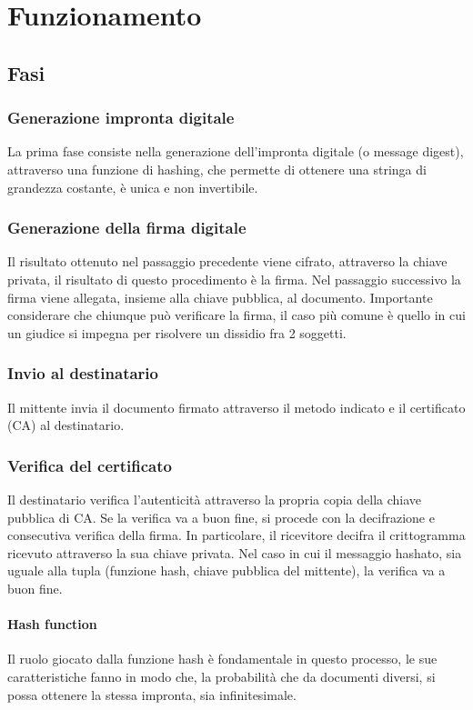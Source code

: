 \chapter{Funzionamento}

\section{Fasi}

\subsection{Generazione impronta digitale}

La prima fase consiste nella generazione dell'impronta digitale (o message digest), attraverso una funzione di hashing, che permette di ottenere una stringa di grandezza costante, è unica e non invertibile. 

\subsection{Generazione della firma digitale}
Il risultato ottenuto nel passaggio precedente viene cifrato, attraverso la chiave privata, il risultato di questo procedimento è la firma. Nel passaggio successivo la firma viene allegata, insieme alla chiave pubblica, al documento. Importante considerare che chiunque può verificare la firma, il caso più comune è quello in cui un giudice si impegna per risolvere un dissidio fra 2 soggetti.

\subsection{Invio al destinatario}

Il mittente invia il documento firmato attraverso il metodo indicato e il certificato (CA) al destinatario.

\subsection{Verifica del certificato}

Il destinatario verifica l'autenticità attraverso la propria copia della chiave pubblica di CA. Se la verifica va a buon fine, si procede con la decifrazione e consecutiva verifica della firma. In particolare, il ricevitore decifra il crittogramma ricevuto attraverso la sua chiave privata. Nel caso in cui il messaggio hashato, sia uguale alla tupla (funzione hash, chiave pubblica del mittente), la verifica va a buon fine.

\subsubsection{Hash function}

Il ruolo giocato dalla funzione hash è fondamentale in questo processo, le sue caratteristiche fanno in modo che, la probabilità che da documenti diversi, si possa ottenere la stessa impronta, sia infinitesimale.